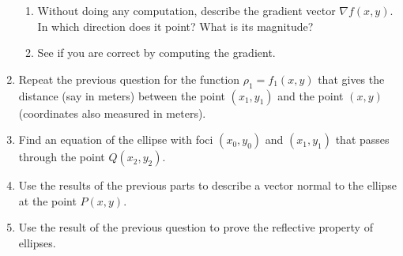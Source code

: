 \documentclass{ximera}
\begin{document}
\begin{question}
\begin{enumerate}
\begin{enumerate}
\item Without doing any computation, describe the gradient vector $\nabla f(x,y)$. In which direction does it point? What is its magnitude?

\item See if you are correct by computing the gradient.
\end{enumerate}

\item Repeat the previous question for the function $\rho_1 = f_1(x,y)$ that gives the distance (say in meters) between the point $(x_1, y_1)$ and the point $(x,y)$ (coordinates also measured in meters).

\item Find an equation of the ellipse with foci $(x_0,y_0)$ and $(x_1, y_1)$ that passes through the point $Q(x_2,y_2)$.

\item Use the results of the previous parts to describe a vector normal to the ellipse at the point $P(x,y)$.

\item Use the result of the previous question to prove the reflective property of ellipses.


\end{enumerate}
\end{question}
\end{document}
